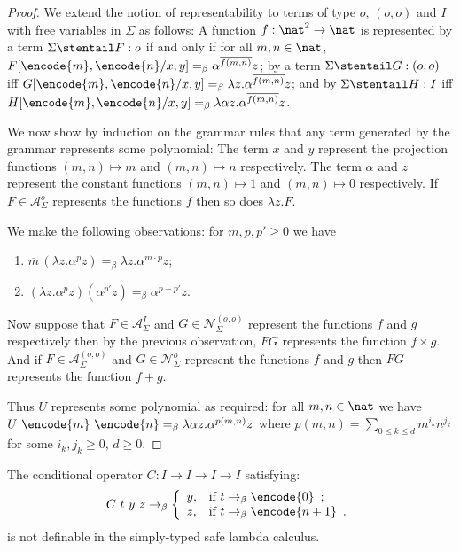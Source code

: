 \begin{proof}
We extend the notion of representability to terms of type $o$,
$(o,o)$ and $I$ with free variables in $\Sigma$ as follows: A
function $f:\nat^2 \rightarrow \nat$ is represented by a term
$\Sigma \stentail F:o$ if and only if for all $m,n\in\nat$,
$F[\encode{m}, \encode{n}/x,y] =_\beta \alpha^{\overline{f(m,n)}}
z$; by a term $\Sigma \stentail G:(o,o)$ iff $G[\encode{m},
\encode{n}/x,y] =_\beta \lambda z . \alpha^{\overline{f(m,n)}} z$;
and by $\Sigma \stentail H:I$ iff $H[\encode{m}, \encode{n}/x,y]
=_\beta \lambda \alpha z . \alpha^{\overline{f(m,n)}} z$.

We now show by induction on the grammar rules that any term
generated by the grammar represents some polynomial: The term $x$
and $y$ represent the projection functions $(m,n)\mapsto m$ and
$(m,n)\mapsto n$ respectively. The term $\alpha$ and $z$ represent
the constant functions $(m,n)\mapsto 1$ and $(m,n)\mapsto 0$
respectively. If $F\in \mathcal{A}^o_\Sigma$ represents the
functions $f$ then so does $\lambda z. F$.

We make the following observations: for $m, p, p' \geq 0$ we have
\begin{enumerate}
\item ${\overline m} \, (\lambda z.\alpha^p z) =_\beta \lambda z . \alpha^{m \cdot p} z$;
\item $(\lambda z.\alpha^p z) (\alpha^{p'} z) =_\beta \alpha^{p + p'} z$.
\end{enumerate}

Now suppose that $F\in \mathcal{A}^I_\Sigma$ and $G\in
\mathcal{N}^{(o,o)}_\Sigma$ represent the functions $f$ and $g$
respectively then by the previous observation, $F G$ represents the
function $f \times g$. And if $F\in \mathcal{A}^{(o,o)}_\Sigma$ and
$G\in \mathcal{N}^o_\Sigma$ represent the functions $f$ and $g$ then
$F G$ represents the function $f+g$.

Thus $U$ represents some polynomial as required: for all $m,n\in
\nat$ we have $U~\encode{m}~\encode{n} =_\beta \lambda \alpha z .
\alpha^{p(m,n)} z$ where $p(m,n) = \sum_{0\leq k \leq d} m^{i_k}
n^{j_k}$ for some $i_k,j_k \geq 0$, $d\geq 0$.
\end{proof}

\begin{corollary}
The conditional operator $C:I\rightarrow I\rightarrow I \rightarrow
I$ satisfying:
$$
C~t~y~z \rightarrow_\beta \left\{
                            \begin{array}{ll}
                              y, & \hbox{if $t
\rightarrow_\beta \encode{0}$\enspace ;} \\
                              z, & \hbox{if
$t \rightarrow_\beta \encode{n+1}$\enspace .}
                            \end{array}
                          \right.
$$
is not definable in the simply-typed safe lambda calculus.
\end{corollary}

